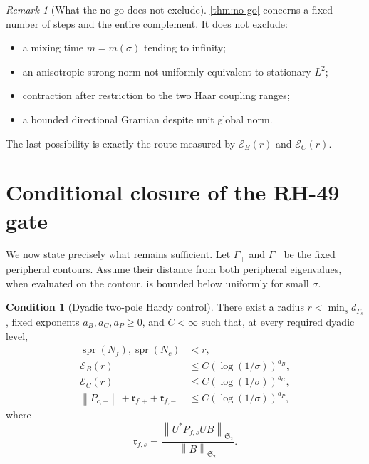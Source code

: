 \documentclass[11pt]{article}
\theoremstyle{definition}
\newtheorem{condition}[theorem]{Condition}
\theoremstyle{remark}
\newtheorem{remark}[theorem]{Remark}
\newcommand{\cE}{\mathcal E}
\newcommand{\HS}{\mathfrak S_2}
\newcommand{\spr}{\operatorname{spr}}
\newcommand{\norm}[1]{\left\lVert #1\right\rVert}
\begin{document}
\begin{remark}[What the no-go does not exclude]
\cref{thm:no-go} concerns a fixed number of steps and the entire complement.
It does not exclude:
\begin{itemize}[leftmargin=2em]
 \item a mixing time \(m=m(\sigma)\) tending to infinity;
 \item an anisotropic strong norm not uniformly equivalent to stationary
 \(L^2\);
 \item contraction after restriction to the two Haar coupling ranges;
 \item a bounded directional Gramian despite unit global norm.
\end{itemize}
The last possibility is exactly the route measured by
\(\cE_B(r)\) and \(\cE_C(r)\).
\end{remark}

\section{Conditional closure of the RH-49 gate}
\label{sec:closure}

We now state precisely what remains sufficient.  Let
\(\Gamma_+\) and \(\Gamma_-\) be the fixed peripheral contours.  Assume
their distance from both peripheral eigenvalues, when evaluated on the
contour, is bounded below uniformly for small \(\sigma\).

\begin{condition}[Dyadic two-pole Hardy control]
\label{cond:hardy-control}
There exist a radius \(r<\min_s d_{\Gamma_s}\), fixed exponents
\(a_B,a_C,a_P\ge0\), and \(C<\infty\) such that, at every required dyadic
level,
\begin{align}
 \spr(N_f),\spr(N_c)&<r,
 \label{eq:uniform-radius}\\
 \cE_B(r)&\le C(\log(1/\sigma))^{a_B},
 \label{eq:polylog-left}\\
 \cE_C(r)&\le C(\log(1/\sigma))^{a_C},
 \label{eq:polylog-right}\\
 \norm{P_{c,-}}
 +\mathfrak r_{f,+}+\mathfrak r_{f,-}
 &\le C(\log(1/\sigma))^{a_P},
 \label{eq:polylog-projectors}
\end{align}
where
\[
 \mathfrak r_{f,s}
 =
 \frac{\norm{U^*P_{f,s}UB}_{\HS}}{\norm B_{\HS}}.
\]
\end{condition}
\end{document}
